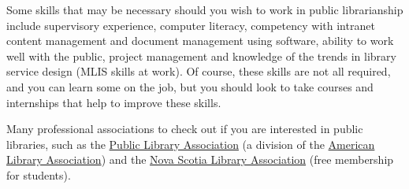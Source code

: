 \documentclass[
  letterpaper,
  DIV=11,
  numbers=noendperiod]{scrreprt}
\begin{document}
Some skills that may be necessary should you wish to work in public
librarianship include supervisory experience, computer literacy,
competency with intranet content management and document management
using software, ability to work well with the public, project management
and knowledge of the trends in library service design (MLIS skills at
work). Of course, these skills are not all required, and you can learn
some on the job, but you should look to take courses and internships
that help to improve these skills.

Many professional associations to check out if you are interested in
public libraries, such as the \href{https://www.ala.org/pla/}{Public
Library Association} (a division of the
\href{https://www.ala.org/}{American Library Association}) and the
\href{https://www.nsla.ns.ca/}{Nova Scotia Library Association} (free
membership for students).
\end{document}
